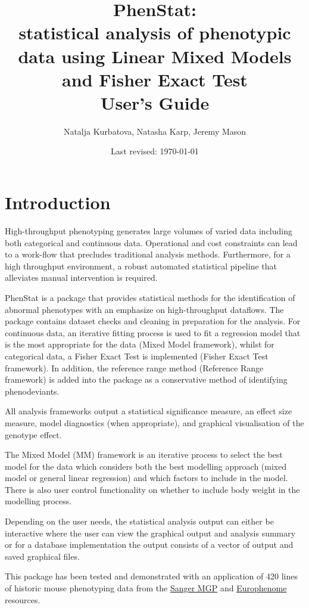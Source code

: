 \documentclass[12pt,a4paper]{article}
\title{\textbf{PhenStat}: \\ statistical analysis of phenotypic data using Linear Mixed Models and Fisher Exact Test\\ \textbf{User's Guide}}
\author{Natalja Kurbatova, Natasha Karp, Jeremy Mason}
\date{Last revised: \today}
\begin{document}
\maketitle
\newpage
\tableofcontents
\newpage
\section{Introduction}
High-throughput phenotyping generates large volumes of varied data including both categorical and continuous data. Operational and cost constraints can lead to a work-flow that precludes traditional analysis methods. Furthermore, for a high throughput environment, a robust automated statistical pipeline that alleviates manual intervention is required. 

PhenStat is a package that provides statistical methods for the identification of abnormal phenotypes with an emphasize on high-throughput dataflows. The package contains dataset checks and cleaning in preparation for the analysis. For continuous data, an iterative fitting process is used to fit a regression model that is the most appropriate for the data (Mixed Model framework), whilst for categorical data, a Fisher Exact Test is implemented (Fisher Exact Test framework). In addition, the reference range method (Reference Range framework) is added into the package as a conservative method of identifying phenodeviants.  

All analysis frameworks output a statistical significance measure, an effect size measure, model diagnostics (when appropriate), and graphical visualisation of the genotype effect. 

The Mixed Model (MM) framework is an iterative process to select the best model for the data which considers both the best modelling approach (mixed model or general linear regression) and which factors to include in the model. There is also user control functionality on whether to include body weight in the modelling process. 

Depending on the user needs, the statistical analysis output can either be interactive where the user can view the graphical output and analysis summary or for a database implementation the output consists of a vector of output and saved graphical files. 

This package has been tested and demonstrated with an application of 420 lines of historic mouse phenotyping data from the  \href{http://www.sanger.ac.uk/mouseportal/}{Sanger MGP} and \href{http://www.europhenome.org/}{Europhenome} resources. 
\\
\end{document}
